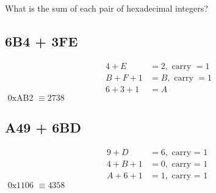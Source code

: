 \documentclass{article}
\begin{document}
\section{}
What is the sum of each pair of hexadecimal integers?

\subsection{6B4 + 3FE}

\begin{align*}
	4 + E & = 2, \text{ carry } = 1 \\
	B + F + 1 & = B, \text{ carry } = 1 \\
	6 + 3 + 1 & = A
\end{align*}
$ \text{ 0xAB2 } \equiv 2738 $

\subsection{A49 + 6BD}
\begin{align*}
	9 + D & = 6, \text{ carry = 1 } \\
	4 + B + 1 & = 0, \text{ carry = 1 } \\
	A + 6 + 1 & = 1, \text{ carry = 1 }
\end{align*}
$ \text{ 0x1106 } \equiv 4358 $
\end{document}

